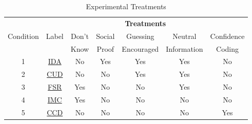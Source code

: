 \begin{table}[H]
\centering
\caption{Experimental Treatments}
\label{tab:conditions}
\begin{tabular}{ccccccc}
\hline
           & \multicolumn{6}{c}{\textbf{Treatments}}              \\
 Condition & Label & Don't & Social & Guessing   & Neutral     & Confidence \\
           &       & Know  & Proof  & Encouraged & Information & Coding  \\ \hline
 1        & \hyperref[txt:IDA]{IDA} & No    & Yes    & Yes        &  Yes        & No         \\
 2        & \hyperref[txt:CUD]{CUD} & No    & No     & Yes        &  Yes        & No         \\
 3        & \hyperref[txt:FSR]{FSR} & Yes   & No     & No         &  Yes        & No         \\
 4        & \hyperref[txt:IMC]{IMC}& Yes   & No     & No         &  No         & No         \\
 5        & \hyperref[txt:CCD]{CCD} & No    & No     & No         &  No         & Yes        \\ \hline
\end{tabular}
\end{table}
{}